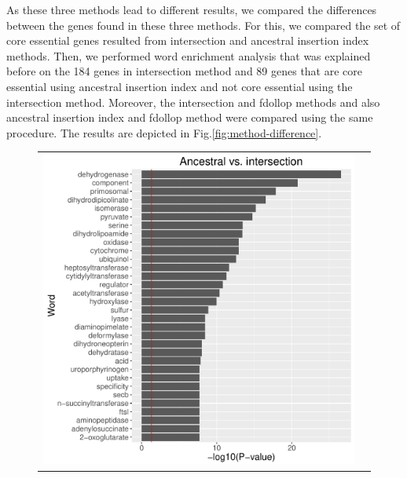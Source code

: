 \documentclass[12pt,letterpaper]{article}
\begin{document}
As these three methods lead to different results, we compared the differences between the genes found in these three methods. For this, we compared the set of core essential genes resulted from intersection and ancestral insertion index methods. Then, we performed word enrichment analysis that was explained before on the 184 genes in intersection method and 89 genes that are core essential using ancestral insertion index and not core essential using the intersection method. Moreover, the intersection and fdollop methods and also ancestral insertion index and fdollop method were compared using the same procedure. The results are depicted in Fig.\@\ref{fig:method-difference}.

\begin{figure}
\centering
\begin{tabular}{c c}
\includegraphics[scale=0.4]{ancestral-intersection-pval.pdf}&

\end{tabular}
\end{figure}
\end{document}
